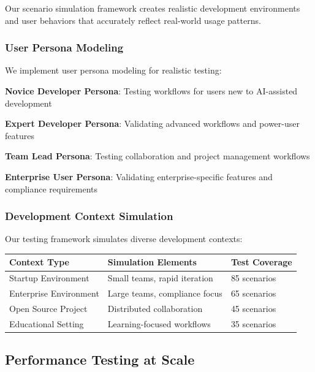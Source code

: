 Our scenario simulation framework creates realistic development environments and user behaviors that accurately reflect real-world usage patterns.

\subsubsection*{User Persona Modeling}

We implement user persona modeling for realistic testing:

\begin{expandedlist}
    \item \textbf{Novice Developer Persona}: Testing workflows for users new to AI-assisted development
    \item \textbf{Expert Developer Persona}: Validating advanced workflows and power-user features
    \item \textbf{Team Lead Persona}: Testing collaboration and project management workflows
    \item \textbf{Enterprise User Persona}: Validating enterprise-specific features and compliance requirements
\end{expandedlist}

\subsubsection*{Development Context Simulation}

Our testing framework simulates diverse development contexts:

\begin{center}
\begin{tabular}{@{}lll@{}}
\toprule
\textbf{Context Type} & \textbf{Simulation Elements} & \textbf{Test Coverage} \\
\midrule
Startup Environment & Small teams, rapid iteration & 85 scenarios \\
Enterprise Environment & Large teams, compliance focus & 65 scenarios \\
Open Source Project & Distributed collaboration & 45 scenarios \\
Educational Setting & Learning-focused workflows & 35 scenarios \\
\bottomrule
\end{tabular}
\end{center}

\subsection*{Performance Testing at Scale}

